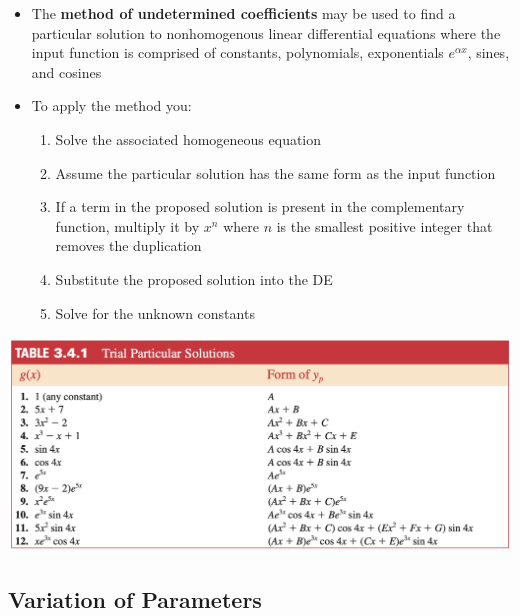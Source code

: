 \documentclass{article}
\begin{document}
\begin{itemize}
  \item The \textbf{method of undetermined coefficients} may be used to find a particular solution to nonhomogenous linear differential equations where the input function is comprised of constants, polynomials, exponentials $e^{\alpha x}$, sines, and cosines

  \item To apply the method you:

        \begin{enumerate}
          \item Solve the associated homogeneous equation

          \item Assume the particular solution has the same form as the input function

          \item If a term in the proposed solution is present in the complementary function, multiply it by $x^n$ where $n$ is the smallest positive integer that removes the duplication

          \item Substitute the proposed solution into the DE

          \item Solve for the unknown constants
        \end{enumerate}
\end{itemize}

\includegraphics*[scale=0.44]{trial-particular-solutions.png}

\subsection{Variation of Parameters}
\end{document}
